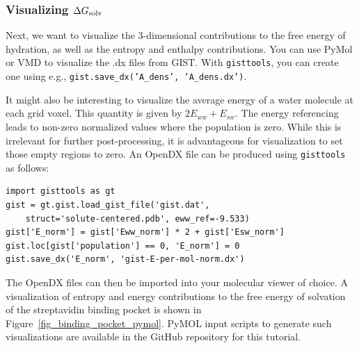 \documentclass[9pt,tutorial]{livecoms}
\newcommand{\dgsolv}{\Delta G_\textup{solv}}
\newcommand{\software}{\texttt}
\newcommand\inlinecode{\texttt}
\begin{document}
\subsubsection{Visualizing $\dgsolv$}
Next, we want to visualize the 3-dimensional contributions to the free energy of hydration, as well as the entropy and enthalpy contributions.
You can use PyMol\cite{pymol} or VMD\cite{vmd} to visualize the .dx files from GIST\@.
With \software{gisttools}, you can create one using e.g., \inlinecode{gist.save\_dx('A\_dens', 'A\_dens.dx')}.

It might also be interesting to visualize the average energy of a water molecule at each grid voxel.
This quantity is given by $2E_{ww} + E_{sw}$.
The energy referencing leads to non-zero normalized values where the population is zero.
While this is irrelevant for further post-processing, it is advantageous for visualization to set those empty regions to zero.
An OpenDX file can be produced using \software{gisttools} as follows:

\begin{lstlisting}[style=python]
import gisttools as gt
gist = gt.gist.load_gist_file('gist.dat',
    struct='solute-centered.pdb', eww_ref=-9.533)
gist['E_norm'] = gist['Eww_norm'] * 2 + gist['Esw_norm']
gist.loc[gist['population'] == 0, 'E_norm'] = 0
gist.save_dx('E_norm', 'gist-E-per-mol-norm.dx')
\end{lstlisting}

The OpenDX files can then be imported into your molecular viewer of choice.
A visualization of entropy and energy contributions to the free energy of solvation of the streptavidin binding pocket is shown in Figure~\ref{fig_binding_pocket_pymol}. PyMOL input scripts to generate such visualizations are available in the GitHub repository for this tutorial.
\end{document}
